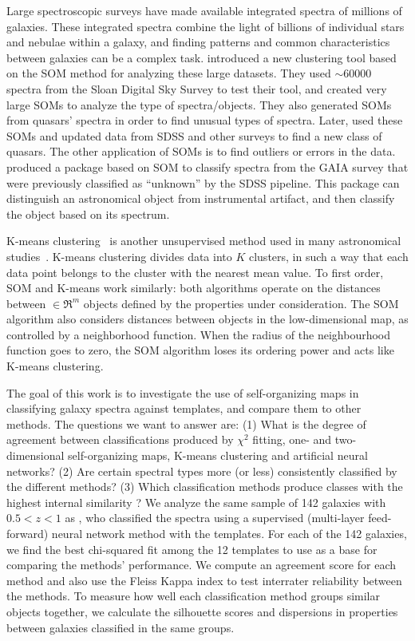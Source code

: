 Large spectroscopic surveys have made available integrated spectra of millions of galaxies.
These integrated spectra combine the light of billions of individual stars and nebulae within a galaxy, and
finding patterns and common characteristics between galaxies can be a complex task.
\citet{In12} introduced a new clustering tool based on the SOM method for analyzing these large datasets.
They used $\sim 60000$ spectra from the Sloan Digital Sky Survey \citep[SDSS;][]{Abazajian09} to test their tool, and created very large SOMs to analyze the type of spectra/objects.
They also generated SOMs from quasars' spectra in order to find unusual types of spectra. 
Later, \citet{Meusinger16} used these SOMs and updated data from SDSS and other surveys to find a new class of quasars.
The other application of SOMs is to find outliers or errors in the data.
\citet{Fustes13} produced a package based on SOM to classify spectra from the GAIA survey that were previously classified as ``unknown'' by the SDSS pipeline. This package can distinguish an astronomical object from instrumental artifact, and then classify the object based on its spectrum.


K-means clustering~\citep{Macqueen67} is another unsupervised method used in many astronomical studies~\citep[e.g.][]{DAbrusco12,Ordov14,Boersma14,Aycha16}.
K-means clustering divides data into $K$ clusters, in such a way that each data point belongs to the cluster with the nearest mean value.
To first order, SOM and K-means work similarly: both algorithms operate on the distances between  $\in \Re^m$ objects defined by the properties under consideration.
The SOM algorithm also considers distances between objects in the low-dimensional map, as controlled by a neighborhood function. 
When the radius of the neighbourhood function goes to zero, the SOM algorithm loses its ordering power and acts like K-means clustering.




The goal of this work is to investigate the use of self-organizing maps in classifying galaxy spectra against templates, and compare them to other methods. 
The questions we want to answer are: 
(1) What is the degree of agreement between classifications produced by $\chi^2$ fitting, one- and two-dimensional self-organizing maps, K-means clustering and artificial neural networks? 
(2) Are certain spectral types more (or less) consistently classified by the different methods? 
(3) Which classification methods produce classes with the highest internal similarity ?
We analyze the same sample of 142 galaxies with $0.5 < z < 1$ as 
\citet[][hereafter ]{Hossein12}, who classified the spectra using a supervised (multi-layer feed-forward) neural network method with the  templates.
For each of the 142 galaxies, we find the best chi-squared fit among the 12 templates to use as a base for comparing the methods' performance.
We compute an agreement score for each method and also use the Fleiss Kappa index \citet{Fleiss71} to test interrater reliability 
between the methods.
To measure how well each classification method groups similar objects together, we
calculate the silhouette scores and dispersions in properties between galaxies classified in the same groups.



